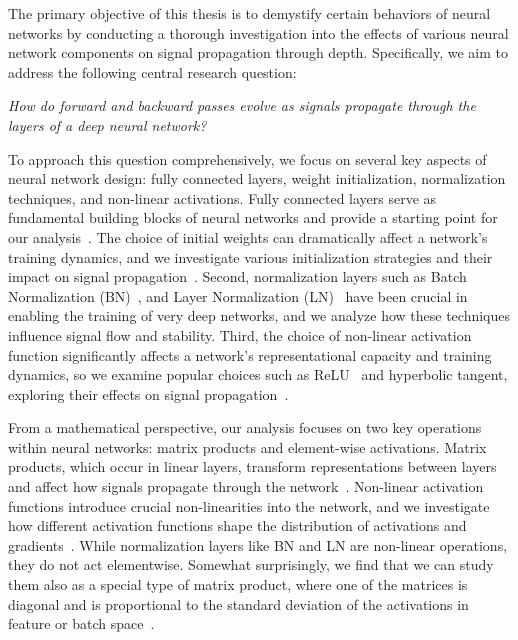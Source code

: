 The primary objective of this thesis is to demystify certain behaviors of neural networks by conducting a thorough investigation into the effects of various neural network components on signal propagation through depth. Specifically, we aim to address the following central research question: 

\textit{How do forward and backward passes evolve as signals propagate through the layers of a deep neural network?}

To approach this question comprehensively, we focus on several key aspects of neural network design: fully connected layers, weight initialization, normalization techniques, and non-linear activations. Fully connected layers serve as fundamental building blocks of neural networks and provide a starting point for our analysis~\cite{saxe2013exact}. The choice of initial weights can dramatically affect a network's training dynamics, and we investigate various initialization strategies and their impact on signal propagation~\cite{saxe2013exact,glorot2010understanding, he2015delving}. Second, normalization layers such as Batch Normalization (BN)~\cite{ioffe2015batch}, and Layer Normalization (LN)~\cite{ba2016layer} have been crucial in enabling the training of very deep networks, and we analyze how these techniques influence signal flow and stability. Third, the choice of non-linear activation function significantly affects a network's representational capacity and training dynamics, so we examine popular choices such as ReLU~\cite{nair2010rectified} and hyperbolic tangent, exploring their effects on signal propagation~\cite{glorot2011deep,maas2013rectifier,clevert2015fast,he2015delving,ramachandran2017searching}.


From a mathematical perspective, our analysis focuses on two key operations within neural networks: matrix products and element-wise activations. Matrix products, which occur in linear layers, transform representations between layers and affect how signals propagate through the network~\cite{saxe2013exact}. Non-linear activation functions introduce crucial non-linearities into the network, and we investigate how different activation functions shape the distribution of activations and gradients~\cite{klambauer2017self,pennington2017resurrecting,pennington2018emergence}. While normalization layers like BN and LN are non-linear operations, they do not act elementwise. Somewhat surprisingly, we find that we can study them also as a special type of matrix product, where one of the matrices is diagonal and is proportional to the standard deviation of the activations in feature or batch space~\cite{daneshmand2020batch,daneshmand2021batch}.

